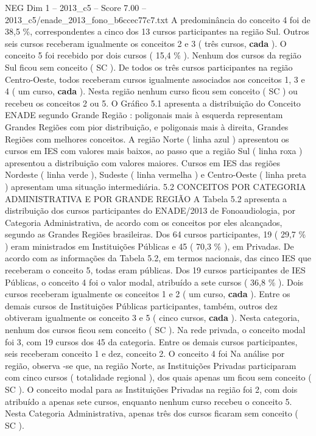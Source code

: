\begin{textsample}{NEG Dim 1 – 2013\_c5 – Score 7.00 – 2013\_c5/enade\_2013\_fono\_b6ccec77c7.txt}
A predominância do conceito 4 foi de 38,5 \%, correspondentes a cinco dos 13 cursos participantes na região Sul.
Outros seis cursos receberam igualmente os conceitos 2 e 3 ( três cursos, \textbf{cada} ).
O conceito 5 foi recebido por dois cursos ( 15,4 \% ).
Nenhum dos cursos da região Sul ficou sem conceito ( SC ).
De todos os três cursos participantes na região Centro-Oeste, todos receberam cursos igualmente associados aos conceitos 1, 3 e 4 ( um curso, \textbf{cada} ).
Nesta região nenhum curso ficou sem conceito ( SC ) ou recebeu os conceitos 2 ou 5.
O Gráfico 5.1 apresenta a distribuição do Conceito ENADE segundo Grande Região : poligonais mais à esquerda representam Grandes Regiões com pior distribuição, e poligonais mais à direita, Grandes Regiões com melhores conceitos.
A região Norte ( linha azul ) apresentou os cursos em IES com valores mais baixos, ao passo que a região Sul ( linha roxa ) apresentou a distribuição com valores maiores.
Cursos em IES das regiões Nordeste ( linha verde ), Sudeste ( linha vermelha ) e Centro-Oeste ( linha preta ) apresentam uma situação intermediária. 5.2 CONCEITOS POR CATEGORIA ADMINISTRATIVA E POR GRANDE REGIÃO A Tabela 5.2 apresenta a distribuição dos cursos participantes do ENADE/2013 de Fonoaudiologia, por Categoria Administrativa, de acordo com os conceitos por eles alcançados, segundo as Grandes Regiões brasileiras.
Dos 64 cursos participantes, 19 ( 29,7 \% ) eram ministrados em Instituições Públicas e 45 ( 70,3 \% ), em Privadas.
De acordo com as informações da Tabela 5.2, em termos nacionais, das cinco IES que receberam o conceito 5, todas eram públicas.
Dos 19 cursos participantes de IES Públicas, o conceito 4 foi o valor modal, atribuído a sete cursos ( 36,8 \% ).
Dois cursos receberam igualmente os conceitos 1 e 2 ( um curso, \textbf{cada} ).
Entre os demais cursos de Instituições Públicas participantes, também, outros dez obtiveram igualmente os conceito 3 e 5 ( cinco cursos, \textbf{cada} ).
Nesta categoria, nenhum dos cursos ficou sem conceito ( SC ).
Na rede privada, o conceito modal foi 3, com 19 cursos dos 45 da categoria.
Entre os demais cursos participantes, seis receberam conceito 1 e dez, conceito 2.
O conceito 4 foi Na análise por região, observa -se que, na região Norte, as Instituições Privadas participaram com cinco cursos ( totalidade regional ), dos quais apenas um ficou sem conceito ( SC ).
O conceito modal para as Instituições Privadas na região foi 2, com dois atribuído a apenas sete cursos, enquanto nenhum curso recebeu o conceito 5.
Nesta Categoria Administrativa, apenas três dos cursos ficaram sem conceito ( SC ).

\end{textsample}
